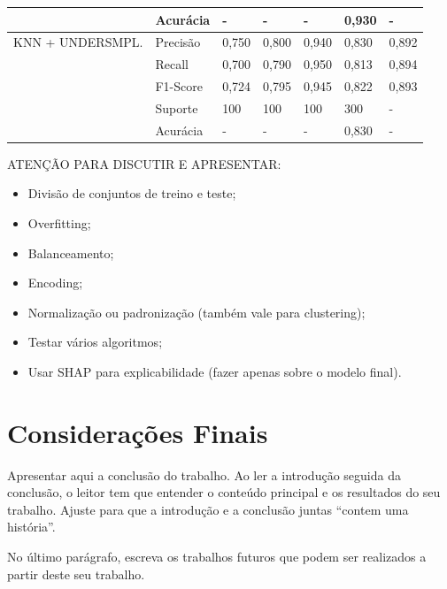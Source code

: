 \documentclass[12pt,a4paper]{article}
\begin{document}
\begin{table}[htbp]
\begin{tabular}{|L{3.16cm}|L{1.90cm}|C{1.62cm}|C{1.62cm}|C{1.62cm}|C{1.62cm}|C{2.50cm}|}
       & Acurácia & - & - & - & 0,930 & - \\ \hline
    KNN + UNDERSMPL. & Precisão & 0,750 & 0,800 & 0,940 & 0,830 & 0,892 \\ \hline
                     & Recall   & 0,700 & 0,790 & 0,950 & 0,813 & 0,894 \\ \hline
                     & F1-Score & 0,724 & 0,795 & 0,945 & 0,822 & 0,893 \\ \hline
                     & Suporte  & 100 & 100 & 100 & 300 & - \\ \hline
                     & Acurácia & - & - & - & 0,830 & - \\ \hline
  \end{tabular}
\end{table}

ATENÇÃO PARA DISCUTIR E APRESENTAR:

\begin{itemize}
  \item Divisão de conjuntos de treino e teste;
  \item Overfitting;
  \item Balanceamento;
  \item Encoding;
  \item Normalização ou padronização (também vale para clustering);
  \item Testar vários algoritmos;
  \item Usar SHAP para explicabilidade (fazer apenas sobre o modelo final).
\end{itemize}

\section{Considerações Finais}\label{sec:consideracoes}

Apresentar aqui a conclusão do trabalho. Ao ler a introdução seguida da
conclusão, o leitor tem que entender o conteúdo principal e os resultados do seu
trabalho. Ajuste para que a introdução e a conclusão juntas “contem uma
história”.

No último parágrafo, escreva os trabalhos futuros que podem ser realizados a
partir deste seu trabalho.
\end{document}
